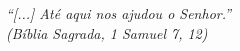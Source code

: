 \begin{epigrafe}
    \vspace*{\fill}
	\begin{flushright}

		\textit{``[...] Até aqui nos ajudou o Senhor.'' \\
		(Bíblia Sagrada, 1 Samuel 7, 12)}
	\end{flushright}
\end{epigrafe}
